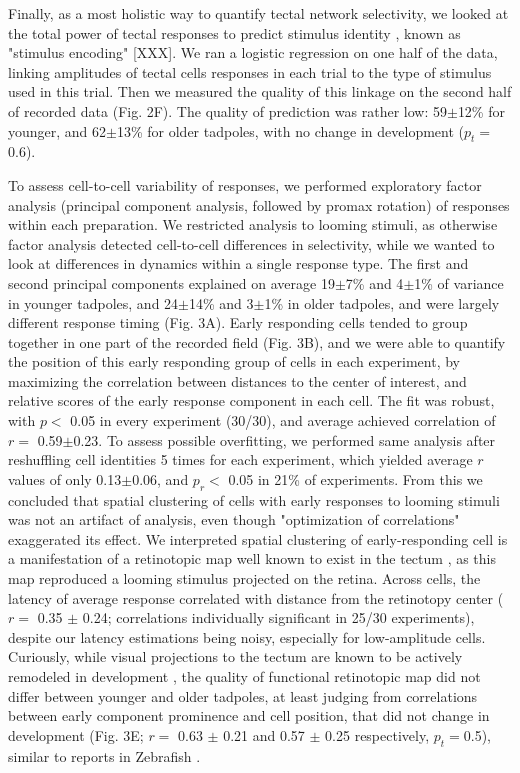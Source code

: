 \documentclass{article}
\begin{document}
Finally, as a most holistic way to quantify tectal network selectivity, we looked at the total power of tectal responses to predict stimulus identity \citep{avitan2016limitations}, known as "stimulus encoding" [XXX]. We ran a logistic regression on one half of the data, linking amplitudes of tectal cells responses in each trial to the type of stimulus used in this trial. Then we measured the quality of this linkage on the second half of recorded data (Fig. 2F). The quality of prediction was rather low: 59$\pm$12\% for younger, and 62$\pm$13\% for older tadpoles, with no change in development ($p_t=$ 0.6).

To assess cell-to-cell variability of responses, we performed exploratory factor analysis (principal component analysis, followed by promax rotation) of responses within each preparation. We restricted analysis to looming stimuli, as otherwise factor analysis detected cell-to-cell differences in selectivity, while we wanted to look at differences in dynamics within a single response type. The first and second principal components explained on average 19$\pm$7\% and 4$\pm$1\% of variance in younger tadpoles, and 24$\pm$14\% and 3$\pm$1\% in older tadpoles, and were largely different response timing (Fig. 3A). Early responding cells tended to group together in one part of the recorded field (Fig. 3B), and we were able to quantify the position of this early responding group of cells in each experiment, by maximizing the correlation between distances to the center of interest, and relative scores of the early response component in each cell. The fit was robust, with $p<$ 0.05 in every experiment (30/30), and average achieved correlation of $r=$ 0.59$\pm$0.23. To assess possible overfitting, we performed same analysis after reshuffling cell identities 5 times for each experiment, which yielded average $r$ values of only 0.13$\pm$0.06, and $p_r<$ 0.05 in 21\% of experiments. From this we concluded that spatial clustering of cells with early responses to looming stimuli was not an artifact of analysis, even though "optimization of correlations" exaggerated its effect. We interpreted spatial clustering of early-responding cell is a manifestation of a retinotopic map well known to exist in the tectum \citep{ruthazer2004map}, as this map reproduced a looming stimulus projected on the retina. Across cells, the latency of average response correlated with distance from the retinotopy center ($r=$ 0.35 $\pm$ 0.24; correlations individually significant in 25/30 experiments), despite our latency estimations being noisy, especially for low-amplitude cells. Curiously, while visual projections to the tectum are known to be actively remodeled in development \citep{sakaguchi1985refinement,ruthazer2004map,munz2014hebbian}, the quality of functional retinotopic map did not differ between younger and older tadpoles, at least judging from correlations between early component prominence and cell position, that did not change in development (Fig. 3E; $r=$ 0.63 $\pm$ 0.21 and 0.57 $\pm$ 0.25 respectively, $p_t= $0.5), similar to reports in Zebrafish \citep{avitan2016limitations}.
\end{document}
